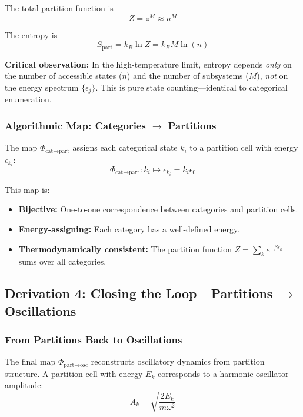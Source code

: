 \documentclass[twocolumn,10pt]{article}
\theoremstyle{remark}
\begin{document}
The total partition function is
\begin{equation}
    Z = z^M \approx n^M
    \label{eq:Z_high_temp}
\end{equation}

The entropy is
\begin{equation}
    S_{\text{part}} = k_B \ln Z = k_B M \ln(n)
    \label{eq:S_part_derivation}
\end{equation}

\textbf{Critical observation:} In the high-temperature limit, entropy depends \textit{only} on the number of accessible states ($n$) and the number of subsystems ($M$), \textit{not} on the energy spectrum $\{\epsilon_j\}$. This is pure state counting—identical to categorical enumeration.

\subsubsection{Algorithmic Map: Categories $\to$ Partitions}

The map $\Phi_{\text{cat} \to \text{part}}$ assigns each categorical state $k_i$ to a partition cell with energy $\epsilon_{k_i}$:
\begin{equation}
    \Phi_{\text{cat} \to \text{part}}: k_i \mapsto \epsilon_{k_i} = k_i \epsilon_0
    \label{eq:map_cat_to_part}
\end{equation}

This map is:
\begin{itemize}
    \item \textbf{Bijective:} One-to-one correspondence between categories and partition cells.
    \item \textbf{Energy-assigning:} Each category has a well-defined energy.
    \item \textbf{Thermodynamically consistent:} The partition function $Z = \sum_k e^{-\beta \epsilon_k}$ sums over all categories.
\end{itemize}

\subsection{Derivation 4: Closing the Loop—Partitions $\to$ Oscillations}

\subsubsection{From Partitions Back to Oscillations}

The final map $\Phi_{\text{part} \to \text{osc}}$ reconstructs oscillatory dynamics from partition structure. A partition cell with energy $E_k$ corresponds to a harmonic oscillator amplitude:
\begin{equation}
    A_k = \sqrt{\frac{2E_k}{m\omega^2}}
    \label{eq:amplitude_from_energy}
\end{equation}
\end{document}
